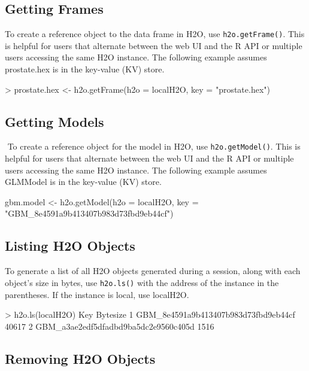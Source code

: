\documentclass[11pt]{article}
\begin{document}
{\subsection{Getting Frames}

To create a reference object to the data frame in H2O, use {\texttt{h2o.getFrame()}}. This is helpful for  users that alternate between the web UI and the R API or multiple users accessing the same H2O instance. The following example assumes prostate.hex is in the key-value (KV) store.

\begin{spverbatim}
> prostate.hex <- h2o.getFrame(h2o = localH2O, key = "prostate.hex")
\end{spverbatim}


\subsection{Getting Models}
 To create a reference object for the model in H2O, use {\texttt{h2o.getModel()}}. This is helpful for  users that alternate between the web UI and the R API or multiple users accessing the same H2O instance. The following example assumes GLMModel is in the key-value (KV) store.
\begin{spverbatim}
gbm.model <- h2o.getModel(h2o = localH2O, key = "GBM_8e4591a9b413407b983d73fbd9eb44cf")
\end{spverbatim}

\subsection{Listing H2O Objects}

To generate a list of all H2O objects generated during a session, along with each object’s size in bytes, use {\texttt{h2o.ls()}} with the address of the instance in the parentheses. If the instance is local, use localH2O. 

\begin{spverbatim}
> h2o.ls(localH2O)
                                                   Key       Bytesize
      1               GBM_8e4591a9b413407b983d73fbd9eb44cf    40617
      2               GBM_a3ae2edf5dfadbd9ba5dc2e9560c405d     1516
\end{spverbatim}


\subsection{Removing H2O Objects}

}
\end{document}
